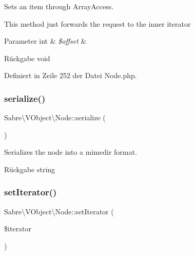 Sets an item through Array\+Access.

This method just forwards the request to the inner iterator


\begin{DoxyParams}[1]{Parameter}
int & {\em \$offset} & \\
\hline
\end{DoxyParams}
\begin{DoxyReturn}{Rückgabe}
void 
\end{DoxyReturn}


Definiert in Zeile 252 der Datei Node.\+php.

\mbox{\label{class_sabre_1_1_v_object_1_1_node_a9c551f52d7470f8fc107d652467858fb}} 
\subsubsection{\texorpdfstring{serialize()}{serialize()}}
{\footnotesize\ttfamily Sabre\textbackslash{}\+V\+Object\textbackslash{}\+Node\+::serialize (\begin{DoxyParamCaption}{ }\end{DoxyParamCaption})\hspace{0.3cm}{\ttfamily [abstract]}}

Serializes the node into a mimedir format.

\begin{DoxyReturn}{Rückgabe}
string 
\end{DoxyReturn}
\mbox{\label{class_sabre_1_1_v_object_1_1_node_a6b84ade1d72b4a99dd940d658edb4105}} 
\subsubsection{\texorpdfstring{set\+Iterator()}{setIterator()}}
{\footnotesize\ttfamily Sabre\textbackslash{}\+V\+Object\textbackslash{}\+Node\+::set\+Iterator (\begin{DoxyParamCaption}\item[{\mbox{\hyperlink{class_sabre_1_1_v_object_1_1_element_list}{Element\+List}}}]{\$iterator }\end{DoxyParamCaption})}

